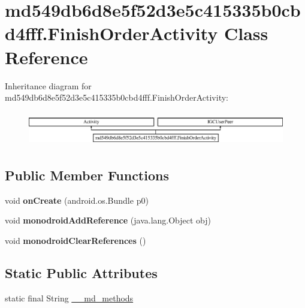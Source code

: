 \hypertarget{classmd549db6d8e5f52d3e5c415335b0cbd4fff_1_1_finish_order_activity}{}\section{md549db6d8e5f52d3e5c415335b0cbd4fff.\+Finish\+Order\+Activity Class Reference}
\label{classmd549db6d8e5f52d3e5c415335b0cbd4fff_1_1_finish_order_activity}
Inheritance diagram for md549db6d8e5f52d3e5c415335b0cbd4fff.\+Finish\+Order\+Activity\+:\begin{figure}[H]
\begin{center}
\leavevmode
\includegraphics[height=1.517615cm]{classmd549db6d8e5f52d3e5c415335b0cbd4fff_1_1_finish_order_activity}
\end{center}
\end{figure}
\subsection*{Public Member Functions}
\begin{DoxyCompactItemize}
\item 
\mbox{\label{classmd549db6d8e5f52d3e5c415335b0cbd4fff_1_1_finish_order_activity_aed08813c024da595545c301158312abd}} 
void {\bfseries on\+Create} (android.\+os.\+Bundle p0)
\item 
\mbox{\label{classmd549db6d8e5f52d3e5c415335b0cbd4fff_1_1_finish_order_activity_a4d9a4c29e9736be27c4f87be402b4208}} 
void {\bfseries monodroid\+Add\+Reference} (java.\+lang.\+Object obj)
\item 
\mbox{\label{classmd549db6d8e5f52d3e5c415335b0cbd4fff_1_1_finish_order_activity_a41f63a9056c935f6ec1a33e6f45f1c97}} 
void {\bfseries monodroid\+Clear\+References} ()
\end{DoxyCompactItemize}
\subsection*{Static Public Attributes}
\begin{DoxyCompactItemize}
\item 
static final String \hyperlink{classmd549db6d8e5f52d3e5c415335b0cbd4fff_1_1_finish_order_activity_ae5bde3a1f470c6a8e254696dd691a82e}{\+\_\+\+\_\+md\+\_\+methods}
\end{DoxyCompactItemize}


